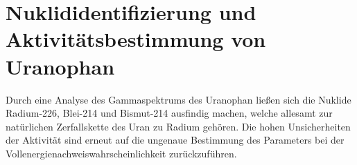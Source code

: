 \section{Nuklididentifizierung und Aktivitätsbestimmung von Uranophan}

Durch eine Analyse des Gammaspektrums des Uranophan ließen sich die Nuklide Radium-226, Blei-214 und Bismut-214 ausfindig machen, welche allesamt zur natürlichen Zerfallskette
des Uran zu Radium gehören. Die hohen Unsicherheiten der Aktivität sind erneut auf die ungenaue Bestimmung des Parameters bei der Vollenergienachweiswahrscheinlichkeit zurückzuführen.